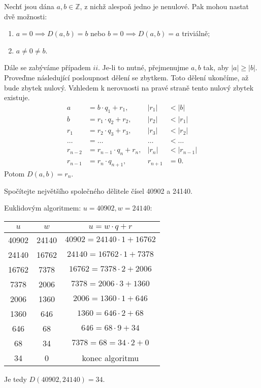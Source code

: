 \begin{definition}\label{eukliduvalg}
Nechť jsou dána $a,b \in \mathbb Z$, z nichž alespoň jedno je nenulové. Pak mohou nastat dvě možnosti:
\begin{enumerate}[$i.$]
  \item $a = 0 \implies D(a, b) = b$ nebo $b=0 \implies D(a,b)=a$ triviálně;
  \item $a \ne 0 \ne b$.
\end{enumerate}
Dále se zabýváme případem $ii$. Je-li to nutné, přejmenujme $a,b$ tak, aby $|a|\geq |b|$.
Proveďme následující posloupnost dělení se zbytkem. Toto dělení ukončíme, až bude zbytek nulový.
Vzhledem k nerovnosti na pravé straně tento nulový zbytek existuje.
\begin{align*}
  a & = b \cdot q_1 + r_1,  & |r_1| & < |b| \\
  b & = r_1 \cdot q_2 + r_2, & |r_2| & < |r_1| \\
  r_1 & = r_2 \cdot q_3 + r_3, & |r_3| & < |r_2|\\
  \dots & = \dots & \dots & < \dots\\
  r_{n-2} & = r_{n-1} \cdot q_n + r_n, & |r_n| & < |r_{n-1}| \\
  r_{n-1} & = r_{n} \cdot q_{n+1}, & r_{n+1} & = 0.
\end{align*}
Potom $D(a,b) = r_n$.
\end{definition}

\begin{priklad}
  Spočítejte největšího společného dělitele čísel 40902 a 24140.
\end{priklad}

\begin{reseni}
  Euklidovým algoritmem: $u = 40902, w = 24140:$
  \begin{center}
    \begin{tabular}{c | c | c}
      $u$ & $w$ & $u=w\cdot q+r$  \\
      \hline
      40902 & 24140 & $40902 = 24140\cdot1 + 16762$ \\
      24140 & 16762 & $24140 = 16762\cdot1 + 7378$ \\
      16762 & 7378 & $16762 = 7378\cdot2 + 2006$  \\
      7378 & 2006 & $7378 = 2006\cdot3 + 1360$  \\
      2006 & 1360 & $2006 = 1360\cdot1 + 646$  \\
      1360 & 646 & $1360 = 646\cdot2 + 68$  \\
      646 & 68 & $646 = 68\cdot9 + 34$  \\
      68 & 34 & $7378 = 68 = 34\cdot2 + 0$  \\
      34 & 0 & konec algoritmu  \\
    \end{tabular}
  \end{center}
  Je tedy $D(40902, 24140) = 34$.
\end{reseni}

